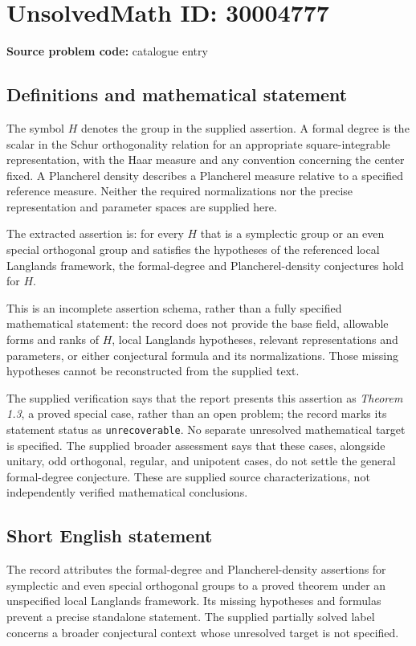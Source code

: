 \documentclass[11pt]{article}
\begin{document}
\section*{UnsolvedMath ID: 30004777}
\textbf{Source problem code:} catalogue entry
\subsection{Definitions and mathematical statement}
The symbol \(H\) denotes the group in the supplied assertion. A formal degree is the scalar in the Schur orthogonality relation for an appropriate square-integrable representation, with the Haar measure and any convention concerning the center fixed. A Plancherel density describes a Plancherel measure relative to a specified reference measure. Neither the required normalizations nor the precise representation and parameter spaces are supplied here.

The extracted assertion is: for every \(H\) that is a symplectic group or an even special orthogonal group and satisfies the hypotheses of the referenced local Langlands framework, the formal-degree and Plancherel-density conjectures hold for \(H\).

This is an incomplete assertion schema, rather than a fully specified mathematical statement: the record does not provide the base field, allowable forms and ranks of \(H\), local Langlands hypotheses, relevant representations and parameters, or either conjectural formula and its normalizations. Those missing hypotheses cannot be reconstructed from the supplied text.

The supplied verification says that the report presents this assertion as \emph{Theorem 1.3}, a proved special case, rather than an open problem; the record marks its statement status as \texttt{unrecoverable}. No separate unresolved mathematical target is specified. The supplied broader assessment says that these cases, alongside unitary, odd orthogonal, regular, and unipotent cases, do not settle the general formal-degree conjecture. These are supplied source characterizations, not independently verified mathematical conclusions.
\subsection{Short English statement}
The record attributes the formal-degree and Plancherel-density assertions for symplectic and even special orthogonal groups to a proved theorem under an unspecified local Langlands framework. Its missing hypotheses and formulas prevent a precise standalone statement. The supplied partially solved label concerns a broader conjectural context whose unresolved target is not specified.
\end{document}
